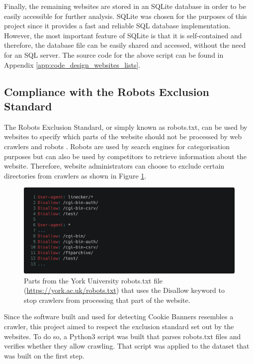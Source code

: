 \documentclass[../main.tex]{subfiles}
\begin{document}
Finally, the remaining websites are stored in an SQLite database \cite{sqlite} in order to be easily accessible for further analysis. SQLite was chosen for the purposes of this project since it provides a fast and reliable SQL database implementation. However, the most important feature of SQLite is that it is self-contained and therefore, the database file can be easily shared and accessed, without the need for an SQL server. The source code for the above script can be found in Appendix \ref{app:code_design_websites_lists}.

\subsection{Compliance with the Robots Exclusion Standard}
The Robots Exclusion Standard, or simply known as robots.txt, can be used by websites to specify which parts of the website should not be processed by web crawlers and robots \cite{koster_1994}. Robots are used by search engines for categorisation purposes but can also be used by competitors to retrieve information about the website. Therefore, website administrators can choose to exclude certain directories from crawlers as shown in Figure \ref{fig:design_example_robots}. 

\begin{figure}[ht]
    \centering
    \includegraphics[width=\textwidth]{images/implementation/example_robots.png}
    \caption{Parts from the York University robots.txt file (\url{https://york.ac.uk/robots.txt}) that uses the Disallow keyword to stop crawlers from processing that part of the website.}
    \label{fig:design_example_robots}
\end{figure}

Since the software built and used for detecting Cookie Banners resembles a crawler, this project aimed to respect the exclusion standard set out by the websites. To do so, a Python3 script was built that parses robots.txt files and verifies whether they allow crawling. That script was applied to the dataset that was built on the first step.
\end{document}
